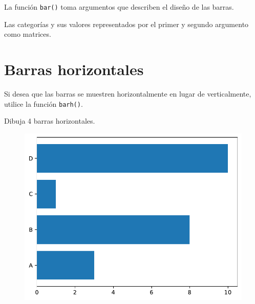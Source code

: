 La función \texttt{bar()} toma argumentos que describen el diseño de las
barras.

Las categorías y sus valores representados por el primer y segundo
argumento como matrices.

\section{Barras horizontales}

Si desea que las barras se muestren horizontalmente en lugar de
verticalmente, utilice la función \texttt{barh()}. \\

\begin{code} Dibuja 4 barras horizontales.

\begin{Shaded}
\begin{Highlighting}[]

\OperatorTok{=}\NormalTok{ np.array([}\NormalTok{, }\NormalTok{, }\NormalTok{, }\NormalTok{])}
\OperatorTok{=}\NormalTok{ np.array([}\NormalTok{, }\NormalTok{, }\NormalTok{, }\NormalTok{])}

\end{Highlighting}
\end{Shaded}

\begin{figure}
  \centering
  \includegraphics[scale=0.6]{img/grafica1046.pdf}
\end{figure}
\end{code}

